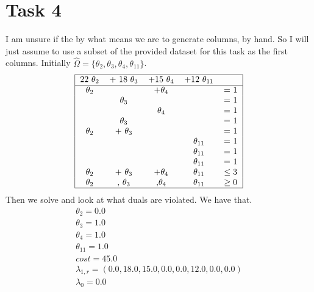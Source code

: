 \documentclass{article}
\begin{document}
    \section*{Task 4}
    I am unsure if the by what means we are to generate columns, by hand.
    So I will just assume to use a subset of the provided dataset for this task as the first columns.
    Initially $\hat{\Omega} = \{ \theta_2, \theta_3, \theta_4, \theta_{11} \}$.
    \[
        \begin{tabular}{ |c c c c c | }
            \hline
            22 $\theta_2$ & + 18 $\theta_3$ & +15 $\theta_4$ & +12 $\theta_{11}$ &\\
            \hline
            $\theta_2$ &                 & +$\theta_4$ &          &  = 1 \\
             &               $\theta_3$ &  &                      &  = 1 \\
             &                           & $\theta_4$ &           &  = 1 \\
             &               $\theta_3$ &  &                      &  = 1 \\
            $\theta_2$ &    + $\theta_3$ &  &                     &  = 1 \\
             &                           &  &      $\theta_{11}$    &  = 1 \\
             &                           &  &      $\theta_{11}$    &  = 1 \\
             &                           &  &      $\theta_{11}$    &  = 1 \\
            $\theta_2$ & + $\theta_3$ & +$\theta_4$ & $\theta_{11}$ & $\leq 3$ \\
            $\theta_2$ & , $\theta_3$ & ,$\theta_4$ & $\theta_{11}$ & $\geq 0$ \\
            \hline
        \end{tabular}
    \]
    Then we solve and look at what duals are violated.
    We have that.
    \begin{equation*}
        \begin{array}{c}
            \theta_{2} = 0.0\\
            \theta_{3} = 1.0\\
            \theta_{4} = 1.0\\
            \theta_{11} = 1.0\\
            cost = 45.0\\
            \lambda_{1,r} = (0.0,18.0,15.0,0.0,0.0,12.0,0.0,0.0)\\
            \lambda_0 = 0.0
        \end{array}
    \end{equation*}
\end{document}
